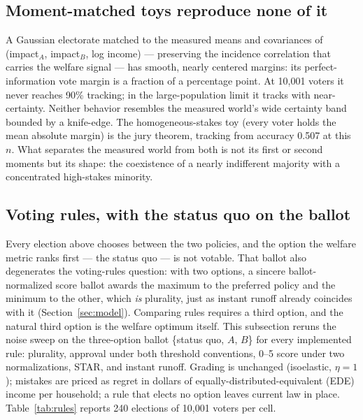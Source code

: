 \documentclass[11pt]{article}
\begin{document}
\subsection{Moment-matched toys reproduce none of it}\label{sec:toys}

A Gaussian electorate matched to the measured means and covariances of
(impact\(_A\), impact\(_B\), log income) --- preserving the incidence
correlation that carries the welfare signal --- has smooth, nearly centered
margins: its perfect-information vote margin is a fraction of a percentage
point. At 10{,}001 voters it never reaches 90\% tracking; in the
large-population limit it tracks with near-certainty. Neither behavior
resembles the measured world's wide certainty band bounded by a
knife-edge. The homogeneous-stakes toy (every voter holds the mean
absolute margin) is the jury theorem, tracking from accuracy 0.507 at this
\(n\). What separates the measured world from both is not its first or
second moments but its shape: the coexistence of a nearly indifferent
majority with a concentrated high-stakes minority.

\subsection{Voting rules, with the status quo on the ballot}
\label{sec:rules}

Every election above chooses between the two policies, and the option
the welfare metric ranks first --- the status quo --- is not votable.
That ballot also degenerates the voting-rules question: with two
options, a sincere ballot-normalized score ballot awards the maximum to
the preferred policy and the minimum to the other, which \emph{is}
plurality, just as instant runoff already coincides with it
(Section~\ref{sec:model}). Comparing rules requires a third option, and
the natural third option is the welfare optimum itself. This subsection
reruns the noise sweep on the three-option ballot \{status quo, \(A\),
\(B\)\} for every implemented rule: plurality, approval under both
threshold conventions, 0--5 score under two normalizations, STAR, and
instant runoff. Grading is unchanged (isoelastic, \(\eta = 1\));
mistakes are priced as regret in dollars of equally-distributed-equivalent
(EDE) income per household; a rule that elects no option leaves current
law in place. Table~\ref{tab:rules} reports 240 elections of 10{,}001
voters per cell.
\end{document}
